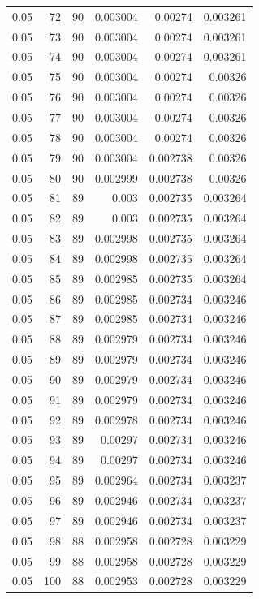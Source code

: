 \begin{tabular}{rrrrrr}
0.05 & 72 & 90 & 0.003004 & 0.00274 & 0.003261 \\
0.05 & 73 & 90 & 0.003004 & 0.00274 & 0.003261 \\
0.05 & 74 & 90 & 0.003004 & 0.00274 & 0.003261 \\
0.05 & 75 & 90 & 0.003004 & 0.00274 & 0.00326 \\
0.05 & 76 & 90 & 0.003004 & 0.00274 & 0.00326 \\
0.05 & 77 & 90 & 0.003004 & 0.00274 & 0.00326 \\
0.05 & 78 & 90 & 0.003004 & 0.00274 & 0.00326 \\
0.05 & 79 & 90 & 0.003004 & 0.002738 & 0.00326 \\
0.05 & 80 & 90 & 0.002999 & 0.002738 & 0.00326 \\
0.05 & 81 & 89 & 0.003 & 0.002735 & 0.003264 \\
0.05 & 82 & 89 & 0.003 & 0.002735 & 0.003264 \\
0.05 & 83 & 89 & 0.002998 & 0.002735 & 0.003264 \\
0.05 & 84 & 89 & 0.002998 & 0.002735 & 0.003264 \\
0.05 & 85 & 89 & 0.002985 & 0.002735 & 0.003264 \\
0.05 & 86 & 89 & 0.002985 & 0.002734 & 0.003246 \\
0.05 & 87 & 89 & 0.002985 & 0.002734 & 0.003246 \\
0.05 & 88 & 89 & 0.002979 & 0.002734 & 0.003246 \\
0.05 & 89 & 89 & 0.002979 & 0.002734 & 0.003246 \\
0.05 & 90 & 89 & 0.002979 & 0.002734 & 0.003246 \\
0.05 & 91 & 89 & 0.002979 & 0.002734 & 0.003246 \\
0.05 & 92 & 89 & 0.002978 & 0.002734 & 0.003246 \\
0.05 & 93 & 89 & 0.00297 & 0.002734 & 0.003246 \\
0.05 & 94 & 89 & 0.00297 & 0.002734 & 0.003246 \\
0.05 & 95 & 89 & 0.002964 & 0.002734 & 0.003237 \\
0.05 & 96 & 89 & 0.002946 & 0.002734 & 0.003237 \\
0.05 & 97 & 89 & 0.002946 & 0.002734 & 0.003237 \\
0.05 & 98 & 88 & 0.002958 & 0.002728 & 0.003229 \\
0.05 & 99 & 88 & 0.002958 & 0.002728 & 0.003229 \\
0.05 & 100 & 88 & 0.002953 & 0.002728 & 0.003229 \\

\end{tabular}
